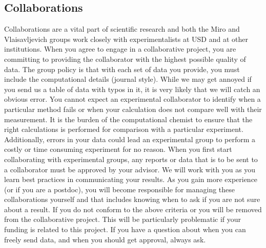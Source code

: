 \documentclass[letterpaper]{article}
\begin{document}
\subsection*{Collaborations}
Collaborations are a vital part of scientific research and both the Miro and Vlaisavljevich groups work closely with experimentalists at USD and at other institutions. When you agree to engage in a collaborative project, you are committing to providing the collaborator with the highest possible quality of data. The group policy is that with each set of data you provide, you must include the computational details (journal style). While we may get annoyed if you send us a table of data with typos in it, it is very likely that we will catch an obvious error. You cannot expect an experimental collaborator to identify when a particular method fails or when your calculation does not compare well with their measurement. It is the burden of the computational chemist to ensure that the right calculations is performed for comparison with a particular experiment. Additionally, errors in your data could lead an experimental group to perform a costly or time consuming experiment for no reason. When you first start collaborating with experimental groups, any reports or data that is to be sent to a collaborator must be approved by your advisor. We will work with you as you learn best practices in communicating your results. As you gain more experience (or if you are a postdoc), you will become responsible for managing these collaborations yourself and that includes knowing when to ask if you are not sure about a result. If you do not conform to the above criteria or you will be removed from the collaborative project. This will be particularly problematic if your funding is related to this project. If you have a question about when you can freely send data, and when you should get approval, always ask.

%
%
%
%



%
\end{document}
